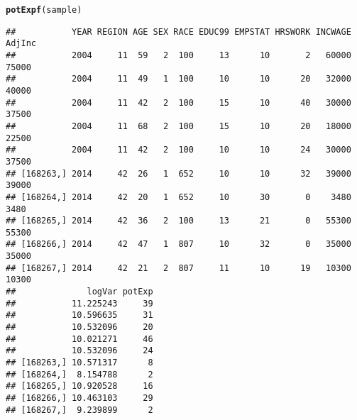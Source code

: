 \documentclass{article}\usepackage[]{graphicx}\usepackage[]{color}
\makeatletter
\newcommand{\hlstd}[1]{\textcolor[rgb]{0.345,0.345,0.345}{#1}}%
\newcommand{\hlkwd}[1]{\textcolor[rgb]{0.737,0.353,0.396}{\textbf{#1}}}%
\newenvironment{kframe}{%
 \def\at@end@of@kframe{}%
 \ifinner\ifhmode%
  \def\at@end@of@kframe{\end{minipage}}%
  \begin{minipage}{\columnwidth}%
 \fi\fi%
 \def\FrameCommand##1{\hskip\@totalleftmargin \hskip-\fboxsep
 \colorbox{shadecolor}{##1}\hskip-\fboxsep
     \hskip-\linewidth \hskip-\@totalleftmargin \hskip\columnwidth}%
 \MakeFramed {\advance\hsize-\width
   \@totalleftmargin\z@ \linewidth\hsize
   \@setminipage}}%
 {\par\unskip\endMakeFramed%
 \at@end@of@kframe}
\newenvironment{knitrout}{}{} %
\makeatother
\begin{document}
\begin{knitrout}
\begin{kframe}
\begin{alltt}
\hlkwd{potExpf}\hlstd{(sample)}
\end{alltt}
\begin{verbatim}
##           YEAR REGION AGE SEX RACE EDUC99 EMPSTAT HRSWORK INCWAGE AdjInc
##           2004     11  59   2  100     13      10       2   60000  75000
##           2004     11  49   1  100     10      10      20   32000  40000
##           2004     11  42   2  100     15      10      40   30000  37500
##           2004     11  68   2  100     15      10      20   18000  22500
##           2004     11  42   2  100     10      10      24   30000  37500
## [168263,] 2014     42  26   1  652     10      10      32   39000  39000
## [168264,] 2014     42  20   1  652     10      30       0    3480   3480
## [168265,] 2014     42  36   2  100     13      21       0   55300  55300
## [168266,] 2014     42  47   1  807     10      32       0   35000  35000
## [168267,] 2014     42  21   2  807     11      10      19   10300  10300
##              logVar potExp
##           11.225243     39
##           10.596635     31
##           10.532096     20
##           10.021271     46
##           10.532096     24
## [168263,] 10.571317      8
## [168264,]  8.154788      2
## [168265,] 10.920528     16
## [168266,] 10.463103     29
## [168267,]  9.239899      2
\end{verbatim}
\end{kframe}
\end{knitrout}
\end{document}
